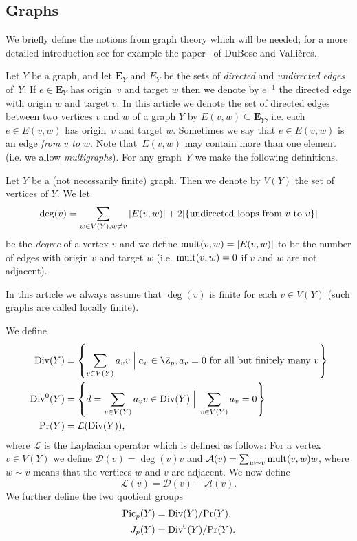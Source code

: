 \subsection{Graphs} 
We briefly define the notions from graph theory which will be needed; for a more detailed introduction see for example the paper~\cite{dubose-vallieres} of DuBose and Valli\`eres. 

Let $Y$ be a graph, and let $\mathbf{E}_Y$ and $E_Y$ be the sets of \emph{directed} and \emph{undirected edges} of~$Y$. If ${e \in \mathbf{E}_Y}$ has origin~$v$ and target $w$ then we denote by $e^{-1}$ the directed edge with origin $w$ and target $v$. 
In this article we denote the set of directed edges between two vertices $v$ and $w$ of a graph $Y$ by ${E(v,w) \subseteq \mathbf{E}_Y}$, i.e. each ${e \in E(v,w)}$ has origin~$v$ and target $w$. Sometimes we say that ${e \in E(v,w)}$ is an edge \emph{from $v$ to $w$}. Note that~$E(v,w)$ may contain more than one element (i.e. we allow \emph{multigraphs}). For any graph~$Y$ we make the following definitions. 
\begin{defi}
	Let $Y$ be a (not necessarily finite) graph. Then we denote by $V(Y)$ the set of vertices of $Y$. We let 
	\[ \deg(v) = \sum_{w \in V(Y), w\neq v} |E(v,w)|+2\vert \{\textup{undirected loops from $v$ to $v$}\}\vert\]
	be the \emph{degree} of a vertex $v$ and we define $\textup{mult}(v,w) = |E(v,w)|$ to be the number of edges with origin $v$ and target $w$ (i.e. $\textup{mult}(v,w) = 0$ if $v$ and $w$ are not adjacent). 
	
	In this article we always assume that $\deg(v)$ is finite for each ${v \in V(Y)}$ (such graphs are called locally finite). 
	
	We define
	\begin{align*}
		\textup{Div}(Y) &=\left\{\sum_{v \in V(Y)} a_v v \; \Big| \; a_v\in \Z_p, a_v=0 \textup{ for all but finitely many }v\right\}\\
		\textup{Div}^0(Y) &=\left\{d = \sum_{v \in V(Y)} a_v v \in \textup{Div}(Y) \; \Big| \; \sum_{v \in V(Y)} a_v=0\right\} \\ 
		\textup{Pr}(Y) &=\mathcal{L}(\textup{Div}(Y)), 
	\end{align*}
	where $\mathcal{L}$ is the Laplacian operator which is defined as follows: For a vertex ${v\in V(Y)}$ we define ${\mathcal{D}(v)=\deg(v)v}$ and ${\mathcal{A}(v)=\sum_{w\sim v} \textup{mult}(v,w) w}$, where ${w \sim v}$ means that the vertices $w$ and $v$ are adjacent. We now define \[\mathcal{L}(v)=\mathcal{D}(v)-\mathcal{A}(v).\]
	We further define the two quotient groups 
	\begin{align*}
		\textup{Pic}_p(Y) &=\textup{Div}(Y)/\textup{Pr}(Y), \\
		J_p(Y) &=\textup{Div}^0(Y)/\textup{Pr}(Y).
	\end{align*}
\end{defi}

